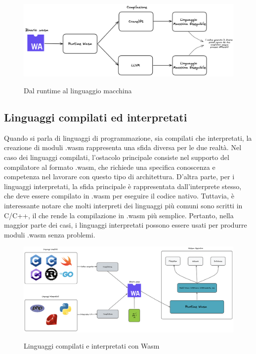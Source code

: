 \begin{figure}[H]
    \centering
    \captionsetup{justification=centering}
    \includegraphics[width=15cm]{./chapters/2.wasi-in-depth/images/11.runtime_to_machine.png}
    \label{runtime_to_machine_code}
    \caption{Dal runtime al linguaggio macchina}
\end{figure}

\subsection{Linguaggi compilati ed interpretati}
Quando si parla di linguaggi di programmazione, sia compilati che interpretati, la creazione di moduli .wasm rappresenta
una sfida diversa per le due realtà. Nel caso dei linguaggi compilati, l'ostacolo principale consiste nel supporto del
compilatore al formato .wasm, che richiede una specifica conoscenza e competenza nel lavorare con questo tipo di
architettura. D'altra parte, per i linguaggi interpretati, la sfida principale è rappresentata dall'interprete stesso,
che deve essere compilato in .wasm per eseguire il codice nativo. Tuttavia, è interessante notare che molti interpreti
dei linguaggi più comuni sono scritti in C/C++, il che rende la compilazione in .wasm più semplice. Pertanto, nella
maggior parte dei casi, i linguaggi interpretati possono essere usati per produrre moduli .wasm senza problemi.

\begin{figure}[H]
    \centering
    \captionsetup{justification=centering}
    \includegraphics[width=15cm]{./chapters/2.wasi-in-depth/images/9.portability_wasm.png}
    \label{wasm_wasi_portability}
    \caption{Linguaggi compilati e interpretati con Wasm}
\end{figure}

